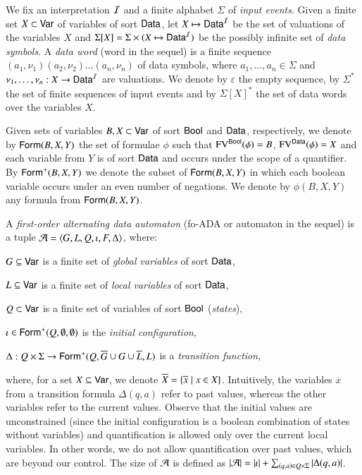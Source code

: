 \documentclass{llncs}
\begin{document}
We fix an interpretation $\mathcal{I}$ and a finite alphabet $\Sigma$ of
\emph{input events}. Given a finite set $X \subset \mathsf{Var}$ of
variables of sort $\mathsf{Data}$, let $X \mapsto \mathsf{Data}^{\mathcal{I}}$ be the set
of valuations of the variables $X$ and $\Sigma[X] = \Sigma
\times (X \mapsto \mathsf{Data}^{\mathcal{I}})$ be the possibly infinite set of
\emph{data symbols}. A \emph{data word} (word in the sequel) is a
finite sequence $(a_1,\nu_1)(a_2,\nu_2) \ldots (a_n,\nu_n)$ of data
symbols, where $a_1,\ldots,a_n \in \Sigma$ and $\nu_1,\ldots,\nu_n :
X \rightarrow \mathsf{Data}^{\mathcal{I}}$ are valuations. We denote by
$\varepsilon$ the empty sequence, by $\Sigma^*$ the set of finite
sequences of input events and by $\Sigma[X]^*$ the set of data
words over the variables $X$.

Given sets of variables $B,X \subset \mathsf{Var}$ of sort $\mathsf{Bool}$ and
$\mathsf{Data}$, respectively, we denote by $\mathsf{Form}(B,X,Y)$ the set of formulae
$\phi$ such that $\mathrm{FV}^{\mathsf{Bool}}(\phi) = B$, $\mathrm{FV}^{\mathsf{Data}}(\phi) = X$ and
each variable from $Y$ is of sort $\mathsf{Data}$ and occurs under the scope
of a quantifier. By $\mathsf{Form}^+(B,X,Y)$ we denote the subset of
$\mathsf{Form}(B,X,Y)$ in which each boolean variable occurs under an even
number of negations. We denote by $\phi(B,X,Y)$ any formula from
$\mathsf{Form}(B,X,Y)$. 

A \emph{first-order alternating data automaton} (fo-ADA or automaton
in the sequel) is a tuple $\mathcal{A} =
\left\langle G,L,Q,\iota,F,\Delta \right\rangle$, where: \begin{compactitem}
%
\item $G \subseteq \mathsf{Var}$ is a finite set of \emph{global
  variables} of sort $\mathsf{Data}$, 
%
\item $L \subseteq \mathsf{Var}$ is a finite set of \emph{local
  variables} of sort $\mathsf{Data}$,
%
\item $Q \subset \mathsf{Var}$ is a finite set of variables of sort $\mathsf{Bool}$
  (\emph{states}),
%
\item $\iota \in \mathsf{Form}^+(Q,\emptyset,\emptyset)$ is the \emph{initial
  configuration},
%
\item $\Delta : Q \times \Sigma \rightarrow
  \mathsf{Form}^+(Q,\overline{G}\cup G\cup\overline{L},L)$
  is a \emph{transition function},
\end{compactitem}
where, for a set $X \subseteq \mathsf{Var}$, we denote $\overline{X} =
\left\{ \overline{x} \mid x \in X \right\}$. Intuitively, the variables
$\overline{x}$ from a transition formula $\Delta(q,a)$ refer to past
values, whereas the other variables refer to the current
values. Observe that the initial values are unconstrained (since the
initial configuration is a boolean combination of states without
variables) and quantification is allowed only over the current local
variables. In other words, we do not allow quantification over past
values, which are beyond our control. The size of $\mathcal{A}$ is defined as
${|{\mathcal{A}}|} = {|{\iota}|} + \sum_{(q,a) \in
  Q\times\Sigma}{|{\Delta(q,a)}|}$.
\end{document}
